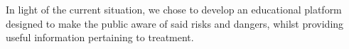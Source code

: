 In light of the current situation, we chose to develop an educational platform designed to make the public aware of said
risks and dangers, whilst providing useful information pertaining to treatment.

